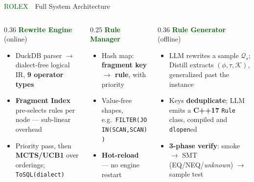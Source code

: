 \documentclass[aspectratio=169]{beamer}
\newcommand{\apptitle}[3]{%
  \textcolor{#1}{#2}~\textcolor{black!30}{\textbar}~#3}
\begin{document}
{\begin{frame}{\apptitle{darkgreen}{ROLEX}{Full System Architecture}}
\vspace{2mm}
\begin{columns}[T]

\begin{column}{0.36\textwidth}
  {\scriptsize\textcolor{darkgreen}{\textbf{Rewrite Engine}} \textcolor{black!55}{(online)}}\\[0.8mm]
  {\tiny
  \begin{itemize}\setlength{\itemsep}{1mm}
    \item DuckDB parser $\to$ dialect-free logical IR, \textbf{9 operator types}
    \item \textbf{Fragment Index} pre-selects rules per node --- sub-linear overhead
    \item Priority pass, then \textbf{MCTS/UCB1} over orderings; \texttt{ToSQL(dialect)}
  \end{itemize}}
\end{column}
\hfill
\begin{column}{0.25\textwidth}
  {\scriptsize\textcolor{darkgreen}{\textbf{Rule Manager}}}\\[0.8mm]
  {\tiny
  \begin{itemize}\setlength{\itemsep}{1mm}
    \item Hash map: \textbf{fragment key $\to$ rule}, with priority
    \item Value-free shapes, e.g.\ \texttt{FILTER(JOIN(SCAN,SCAN))}
    \item \textbf{Hot-reload} --- no engine restart
  \end{itemize}}
\end{column}
\hfill
\begin{column}{0.36\textwidth}
  {\scriptsize\textcolor{darkgreen}{\textbf{Rule Generator}} \textcolor{black!55}{(offline)}}\\[0.8mm]
  {\tiny
  \begin{itemize}\setlength{\itemsep}{1mm}
    \item LLM rewrites a sample $\mathcal{Q}_s$; \textsf{Distill} extracts
          $(\phi, \tau, \mathcal{K})$, generalized past the instance
    \item Keys \textbf{deduplicate}; LLM emits a \textbf{C++17} \texttt{Rule} class,
          compiled and \texttt{dlopen}ed
    \item \textbf{3-phase verify}: smoke $\to$ SMT (EQ/NEQ/\emph{unknown}) $\to$
          sample test
  \end{itemize}}
\end{column}

\end{columns}
\end{frame}

}
\backupend
\end{document}
